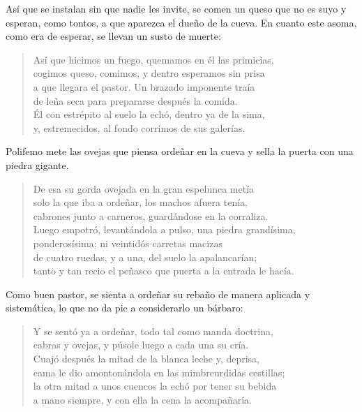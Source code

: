 \documentclass[11pt,a4paper]{article}
\begin{document}
Así que se instalan sin que nadie les invite, se comen un queso que no es suyo y esperan, como tontos, a que aparezca el dueño de la cueva. En cuanto este asoma, como era de esperar, se llevan un susto de muerte:

\begin{verse}
Así que hicimos un fuego, quemamos en él las primicias,\\
cogimos queso, comimos, y dentro esperamos sin prisa\\
a que llegara el pastor. Un brazado imponente traía\\
de leña seca para prepararse después la comida.\\
Él con estrépito al suelo la echó, dentro ya de la sima,\\
y, estremecidos, al fondo corrimos de sus galerías.
\end{verse}

Polifemo mete las ovejas que piensa ordeñar en la cueva y sella la puerta con una piedra gigante.

\begin{verse}
De esa su gorda ovejada en la gran espelunca metía\\
solo la que iba a ordeñar, los machos afuera tenía,\\
cabrones junto a carneros, guardándose en la corraliza.\\
Luego empotró, levantándola a pulso, una piedra grandísima,\\
ponderosísima; ni veintidós carretas macizas\\
de cuatro ruedas, y a una, del suelo la apalancarían;\\
tanto y tan recio el peñasco que puerta a la entrada le hacía.
\end{verse}

Como buen pastor, se sienta a ordeñar su rebaño de manera aplicada y sistemática, lo que no da pie a considerarlo un bárbaro:

\begin{verse}
Y se sentó ya a ordeñar, todo tal como manda doctrina,\\
cabras y ovejas, y púsole luego a cada una su cría.\\
Cuajó después la mitad de la blanca leche y, deprisa,\\
cama le dio amontonándola en las mimbreurdidas cestillas;\\
la otra mitad a unos cuencos la echó por tener su bebida\\
a mano siempre, y con ella la cena la acompañaría.
\end{verse}
\end{document}
